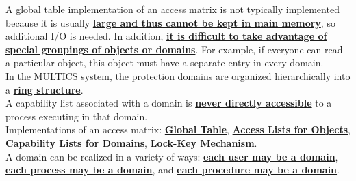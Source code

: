 \documentclass[10pt]{article}
\newcommand{\qw}[1]{\textbf{\ul{#1}}}
\begin{document}
A global table implementation of an access matrix is not typically implemented because it is usually \qw{large and thus cannot be kept in main memory}, so additional I/O is needed. In addition, \qw{it is difficult to take advantage of special groupings of objects or domains}. For example, if everyone can read a particular object, this object must have a separate entry in every domain.\\[2mm]
In the MULTICS system, the protection domains are organized hierarchically into a \qw{ring structure}.\\[2mm]
A capability list associated with a domain is \qw{never directly accessible} to a process executing in that domain.\\[2mm]
Implementations of an access matrix: \qw{Global Table}, \qw{Access Lists for Objects}, \qw{Capability Lists for Domains}, \qw{Lock-Key Mechanism}.\\[2mm]
A domain can be realized in a variety of ways: \qw{each user may be a domain}, \qw{each process may be a domain}, and \qw{each procedure may be a domain}.
\newpage
\end{document}
